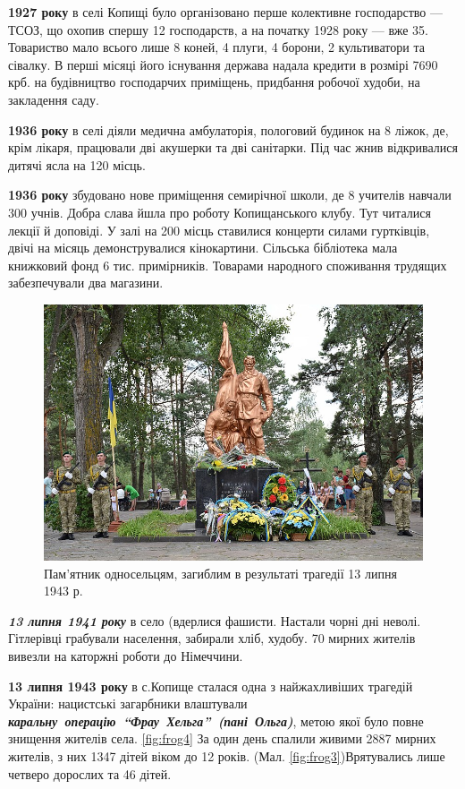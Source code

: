 \textbf{1927 року} в селі Копищі було організовано перше колективне господарство — ТСОЗ, що охопив спершу 12 господарств, а на початку 1928 року — вже 35. Товариство мало всього лише 8 коней, 4 плуги, 4 борони, 2 культиватори та сівалку. В перші місяці його існування держава надала кредити в розмірі 7690 крб. на будівництво господарчих приміщень, придбання робочої худоби, на закладення саду.

\textbf{1936 року} в селі діяли медична амбулаторія, пологовий будинок на 8 ліжок, де, крім лікаря, працювали дві акушерки та дві санітарки. Під час жнив відкривалися дитячі ясла на 120 місць.

\textbf{1936 року} збудовано нове приміщення семирічної школи, де 8 учителів навчали 300 учнів. Добра слава йшла про роботу Копищанського клубу. Тут читалися лекції й доповіді. У залі на 200 місць ставилися концерти силами гуртківців, двічі на місяць демонструвалися кінокартини. Сільська бібліотека мала книжковий фонд 6 тис. примірників. Товарами народного споживання трудящих забезпечували два магазини.
\begin{figure}[h]
	
	\centering
	
	\includegraphics[width=0.8\linewidth]{0.jpg}
	
	\caption{\label{fig:frog3}Пам'ятник односельцям, загиблим в результаті трагедії 13 липня 1943 р.}
	
	\label{fig:mpr}
	
\end{figure}

\textbf{\textsl{13 липня 1941 року}} в село (вдерлися фашисти. Настали чорні дні неволі. Гітлерівці грабували населення, забирали хліб, худобу. 70 мирних жителів вивезли на каторжні роботи до Німеччини.

\textbf{13 липня 1943 року} в с.Копище сталася одна з найжахливіших трагедій України: нацистські загарбники влаштували \mbox{\textbf{\textsl{каральну операцію “Фрау Хельга” (пані Ольга)}}}, метою якої було повне знищення жителів села. \ref{fig:frog4} За один день спалили живими 2887 мирних жителів, з них 1347 дітей віком до 12 років. (Мал. \ref{fig:frog3})Врятувались лише четверо дорослих та 46 дітей.

